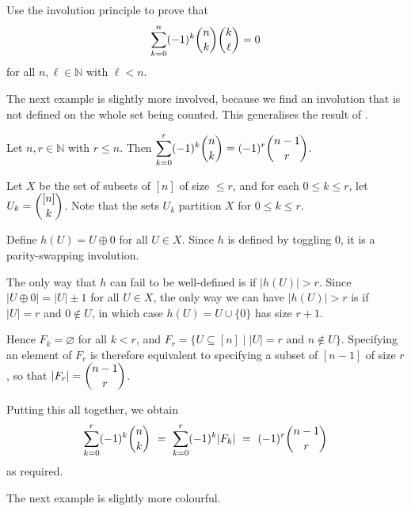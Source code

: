 \begin{exercise}
Use the involution principle to prove that
\[ \sum_{k=0}^n (-1)^k \dbinom{n}{k} \dbinom{k}{\ell} = 0 \]
for all $n,\ell \in \mathbb{N}$ with $\ell < n$.
\end{exercise}

The next example is slightly more involved, because we find an involution that is not defined on the whole set being counted. This generalises the result of .

\begin{proposition}
Let $n,r \in \mathbb{N}$ with $r \le n$. Then $\displaystyle \sum_{k=0}^r (-1)^k \dbinom{n}{k} = (-1)^r \dbinom{n-1}{r}$.
\end{proposition}

\begin{cproof}
Let $X$ be the set of subsets of $[n]$ of size $\le r$, and for each $0 \le k \le r$, let $U_k = \dbinom{[n]}{k}$. Note that the sets $U_k$ partition $X$ for $0 \le k \le r$.

Define $h(U) = U \oplus 0$ for all $U \in X$. Since $h$ is defined by toggling $0$, it is a parity-swapping involution.

The only way that $h$ can fail to be well-defined is if $|h(U)| > r$. Since $|U \oplus 0| = |U| \pm 1$ for all $U \in X$, the only way we can have $|h(U)| > r$ is if $|U| = r$ and $0 \not\in U$, in which case $h(U) = U \cup \{ 0 \}$ has size $r+1$.

Hence $F_k = \varnothing$ for all $k<r$, and $F_r = \{ U \subseteq [n] \mid |U| = r \text{ and } n \not\in U \}$. Specifying an element of $F_r$ is therefore equivalent to specifying a subset of $[n-1]$ of size $r$, so that $|F_r| = \dbinom{n-1}{r}$.

Putting this all together, we obtain
\[ \sum_{k=0}^r (-1)^k \dbinom{n}{k} ~=~ \sum_{k=0}^r (-1)^k |F_k| ~=~ (-1)^r \dbinom{n-1}{r} \]
as required.
\end{cproof}

The next example is slightly more colourful.

